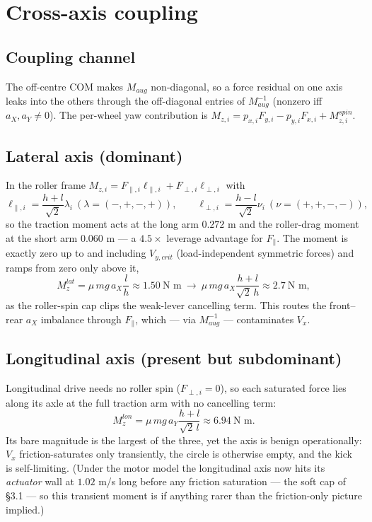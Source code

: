 \documentclass[11pt]{article}
\begin{document}
\section{Cross-axis coupling}
\subsection{Coupling channel}
The off-centre COM makes $M_{aug}$ non-diagonal, so a force residual on one axis leaks into the
others through the off-diagonal entries of $M_{aug}^{-1}$ (nonzero iff $a_X,a_Y\ne0$). The per-wheel
yaw contribution is $M_{z,i}=p_{x,i}F_{y,i}-p_{y,i}F_{x,i}+M_{z,i}^{spin}$.

\subsection{Lateral axis (dominant)}
In the roller frame $M_{z,i}=F_{\parallel,i}\ell_{\parallel,i}+F_{\perp,i}\ell_{\perp,i}$ with
\begin{equation}
\ell_{\parallel,i}=\frac{h+l}{\sqrt2}\lambda_i\ (\lambda=(-,+,-,+)),\qquad
\ell_{\perp,i}=\frac{h-l}{\sqrt2}\nu_i\ (\nu=(+,+,-,-)),
\label{eq:arms}
\end{equation}
so the traction moment acts at the long arm $0.272$ m and the roller-drag moment at the short arm
$0.060$ m --- a $4.5\times$ leverage advantage for $F_\parallel$. The moment is exactly zero up to
and including $V_{y,crit}$ (load-independent symmetric forces) and ramps from zero only above it,
\begin{equation}
M_z^{lat}=\mu\,mg\,a_X\frac{l}{h}\approx1.50\ \text{N m}\ \longrightarrow\ \mu\,mg\,a_X\frac{h+l}{\sqrt2\,h}\approx2.7\ \text{N m},
\end{equation}
as the roller-spin cap clips the weak-lever cancelling term. This routes the front--rear $a_X$
imbalance through $F_\parallel$, which --- via $M_{aug}^{-1}$ --- contaminates $V_x$.

\subsection{Longitudinal axis (present but subdominant)}
Longitudinal drive needs no roller spin ($F_{\perp,i}=0$), so each saturated force lies along its
axle at the full traction arm with no cancelling term:
\begin{equation}
M_z^{lon}=\mu\,mg\,a_Y\frac{h+l}{\sqrt2\,l}\approx6.94\ \text{N m}.
\end{equation}
Its bare magnitude is the largest of the three, yet the axis is benign operationally: $V_x$
friction-saturates only transiently, the circle is otherwise empty, and the kick is self-limiting.
(Under the motor model the longitudinal axis now hits its \emph{actuator} wall at $1.02$ m/s long
before any friction saturation --- the soft cap of \S3.1 --- so this transient moment is if
anything rarer than the friction-only picture implied.)
\end{document}
